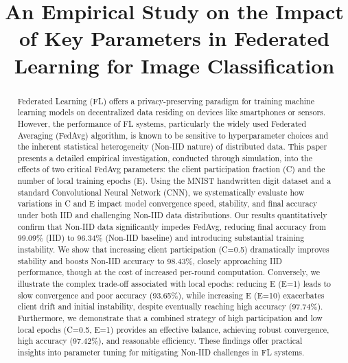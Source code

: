 \documentclass[conference]{IEEEtran}
\begin{document}
\title{An Empirical Study on the Impact of Key Parameters in Federated Learning for Image Classification} %

\author{
    \and
    \and
}

\maketitle

\begin{abstract}
Federated Learning (FL) offers a privacy-preserving paradigm for training machine learning models on decentralized data residing on devices like smartphones or sensors. However, the performance of FL systems, particularly the widely used Federated Averaging (FedAvg) algorithm, is known to be sensitive to hyperparameter choices and the inherent statistical heterogeneity (Non-IID nature) of distributed data. This paper presents a detailed empirical investigation, conducted through simulation, into the effects of two critical FedAvg parameters: the client participation fraction (C) and the number of local training epochs (E). Using the MNIST handwritten digit dataset and a standard Convolutional Neural Network (CNN), we systematically evaluate how variations in C and E impact model convergence speed, stability, and final accuracy under both IID and challenging Non-IID data distributions. Our results quantitatively confirm that Non-IID data significantly impedes FedAvg, reducing final accuracy from 99.09\% (IID) to 96.34\% (Non-IID baseline) and introducing substantial training instability. We show that increasing client participation (C=0.5) dramatically improves stability and boosts Non-IID accuracy to 98.43\%, closely approaching IID performance, though at the cost of increased per-round computation. Conversely, we illustrate the complex trade-off associated with local epochs: reducing E (E=1) leads to slow convergence and poor accuracy (93.65\%), while increasing E (E=10) exacerbates client drift and initial instability, despite eventually reaching high accuracy (97.74\%). Furthermore, we demonstrate that a combined strategy of high participation and low local epochs (C=0.5, E=1) provides an effective balance, achieving robust convergence, high accuracy (97.42\%), and reasonable efficiency. These findings offer practical insights into parameter tuning for mitigating Non-IID challenges in FL systems.
\end{abstract}
\end{document}
